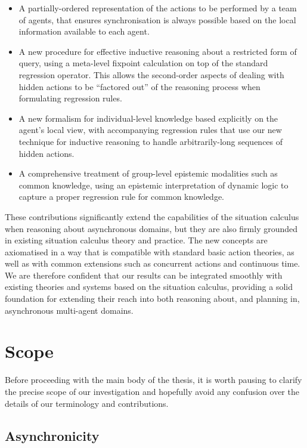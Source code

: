 \begin{itemize}
\item A partially-ordered representation of the actions to be performed
by a team of agents, that ensures synchronisation is always possible
based on the local information available to each agent. 
\item A new procedure for effective inductive reasoning about a restricted
form of query, using a meta-level fixpoint calculation on top of the
standard regression operator. This allows the second-order aspects
of dealing with hidden actions to be {}``factored out'' of the reasoning
process when formulating regression rules. 
\item A new formalism for individual-level knowledge based explicitly on
the agent's local view, with accompanying regression rules that use
our new technique for inductive reasoning to handle arbitrarily-long
sequences of hidden actions. 
\item A comprehensive treatment of group-level epistemic modalities such
as common knowledge, using an epistemic interpretation of dynamic
logic to capture a proper regression rule for common knowledge. 
\end{itemize}
These contributions significantly extend the capabilities of the situation
calculus when reasoning about asynchronous domains, but they are also
firmly grounded in existing situation calculus theory and practice.
The new concepts are axiomatised in a way that is compatible with
standard basic action theories, as well as with common extensions
such as concurrent actions and continuous time. We are therefore confident
that our results can be integrated smoothly with existing theories
and systems based on the situation calculus, providing a solid foundation
for extending their reach into both reasoning about, and planning
in, asynchronous multi-agent domains.


\section{Scope}

Before proceeding with the main body of the thesis, it is worth pausing
to clarify the precise scope of our investigation and hopefully avoid
any confusion over the details of our terminology and contributions.


\subsection{Asynchronicity}

